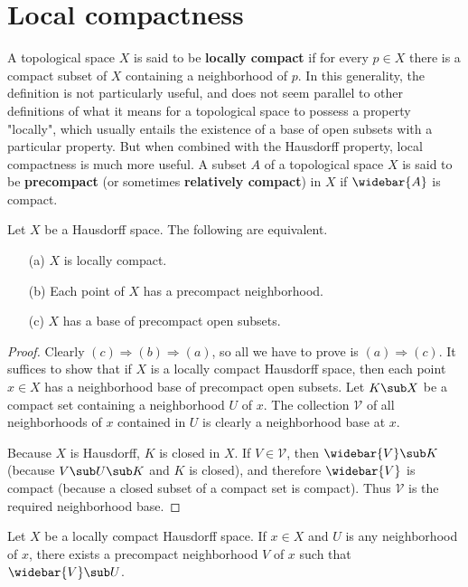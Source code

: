 \section{Local compactness}
A topological space $X$ is said to be \textbf{locally compact} if for every $p\in X$ there is a compact subset of $X$ containing a neighborhood of $p$. In this generality, the definition is not particularly useful, and does not seem parallel to other definitions of what it means for a topological space to possess a property "locally", which usually entails the existence of a base of open subsets with a particular property. But when combined with the Hausdorff property, local compactness is much more useful. A subset $A$ of a topological space $X$ is said to be \textbf{precompact} (or sometimes \textbf{relatively compact}) in $X$ if $\widebar{A}$ is compact.
\begin{proposition}\label{Hausdorff local compact iff}
Let $X$ be a Hausdorff space. The following are equivalent.
\begin{itemize}
\item[(a)] $X$ is locally compact.
\item[(b)] Each point of $X$ has a precompact neighborhood.
\item[(c)] $X$ has a base of precompact open subsets.
\end{itemize}
\end{proposition}
\begin{proof}
Clearly $(c)\Rightarrow(b)\Rightarrow(a)$, so all we have to prove is $(a)\Rightarrow(c)$. It suffices to show that if $X$ is a locally compact Hausdorff space, then each point $x\in X$ has a neighborhood base of precompact open subsets. Let $K\sub X$ be a compact set containing a neighborhood $U$ of $x$. The collection $\mathcal{V}$ of all neighborhoods of $x$ contained in $U$ is clearly a neighborhood base at $x$.\par
Because $X$ is Hausdorff, $K$ is closed in $X$. If $V\in\mathcal{V}$, then $\widebar{V}\sub K$ (because $V\sub U\sub K$ and $K$ is closed), and therefore $\widebar{V}$ is compact (because a closed subset of a compact set is compact). Thus $\mathcal{V}$ is the required neighborhood base.
\end{proof}
\begin{lemma}\label{LCH precompact nbhd closure in nbhd}
Let $X$ be a locally compact Hausdorff space. If $x\in X$ and $U$ is any neighborhood of $x$, there exists a precompact neighborhood $V$ of $x$ such that $\widebar{V}\sub U$.
\end{lemma}
